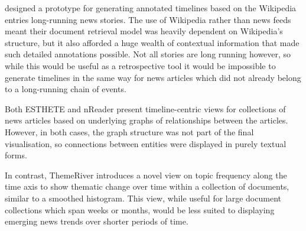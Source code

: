 \citet{ExploringLongRunningNewsStoriesUsingWikipedia} designed a prototype for generating annotated timelines based on the Wikipedia entries long-running news stories. The use of Wikipedia rather than news feeds meant their document retrieval model was heavily dependent on Wikipedia's structure, but it also afforded a huge wealth of contextual information that made such detailed annotations possible. Not all stories are long running however, so while this would be useful as a retrospective tool it would be impossible to generate timelines in the same way for news articles which did not already belong to a long-running chain of events.

Both ESTHETE \citep{ESTHETE} and nReader \citep{Nreader} present timeline-centric views for collections of news articles based on underlying graphs of relationships between the articles. However, in both cases, the graph structure was not part of the final visualisation, so connections between entities were displayed in purely textual forms.

In contrast, ThemeRiver \citep{ThemeRiver} introduces a novel view on topic frequency along the time axis to show thematic change over time within a collection of documents, similar to a smoothed histogram. This view, while useful for large document collections which span weeks or months, would be less suited to displaying emerging news trends over shorter periods of time.

